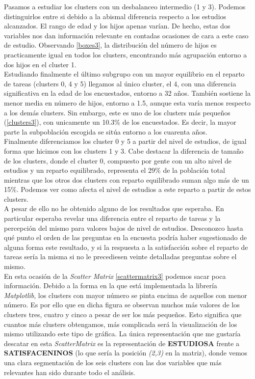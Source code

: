 \documentclass[11pt,a4paper]{article}
\begin{document}
	Pasamos a estudiar los clusters con un desbalanceo intermedio (1 y 3). Podemos distinguirlos entre si debido a la abismal diferencia respecto a los estudios alcanzados. El rango de edad y los hijos apenas varían. De hecho, estas dos variables nos dan información relevante en contadas ocasiones de cara a este caso de estudio. Observando \ref{boxes3}, la distribución del número de hijos es practicamente igual en todos los clusters, encontrando más agrupación entorno a dos hijos en el cluster 1. \\
	
	Estudiando finalmente el último subgrupo con un mayor equilibrio en el reparto de tareas (clusters 0, 4 y 5) llegamos al único cluster, el 4, con una diferencia significativa en la edad de los encuestados, entorno a 32 años. También sostiene la menor media en número de hijos, entorno a 1.5, aunque esta varía menos respecto a los demás clusters. Sin embargo, este es uno de los clusters más pequeños (\ref{clusters3}), con unicamente un 10.3\% de los encuestados. Es decir, la mayor parte la subpoblación escogida se sitúa entorno a los cuarenta años. \\
	
	Finalmente diferenciamos los cluster 0 y 5 a partir del nivel de estudios, de igual forma que hicimos con los clusters 1 y 3. Cabe destacar la diferencia de tamaño de los clusters, donde el cluster 0, compuesto por gente con un alto nivel de estudios y un reparto equilibrado, representa el 29\% de la población total mientras que los otros dos clusters con reparto equilibrado suman algo más de un 15\%. Podemos ver como afecta el nivel de estudios a este reparto a partir de estos clusters. \\
	
	A pesar de ello no he obtenido alguno de los resultados que esperaba. En particular esperaba revelar una diferencia entre el reparto de tareas y la percepción del mismo para valores bajos de nivel de estudios. Desconozco hasta qué punto el orden de las preguntas en la encuesta podría haber sugestionado de alguna forma este resultado, y si la respuesta a la satisfacción sobre el reparto de tareas sería la misma si no le precediesen veinte detalladas preguntas sobre el mismo. \\

	En esta ocasión de la \emph{Scatter Matrix} \ref{scattermatrix3} podemos sacar poca información. Debido a la forma en la que está implementada la librería \emph{Matplotlib}, los clusters con mayor número se pinta encima de aquellos con menor número. Es por ello que en dicha figura se observan muchos más valores de los clusters tres, cuatro y cinco a pesar de ser los más pequeños. Esto significa que cuantos más clusters obtengamos, más complicada será la visualización de los mismo utilizando este tipo de gráfica. La única representación que me gustaría descatar en esta \emph{ScatterMatrix} es la representación de \textbf{ESTUDIOSA} frente a \textbf{SATISFACENINOS} (lo que sería la posición \emph{(2,3)} en la matriz), donde vemos una clara segmentación de los seis clusters con las dos variables que más relevantes han sido durante todo el análisis. \\
\end{document}
